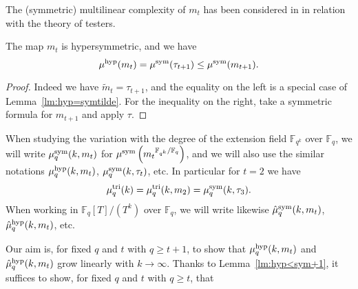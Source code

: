 \documentclass[11pt]{article}
\begin{document}
The (symmetric) multilinear complexity of $m_t$ has been considered in \cite{Bshouty13} in relation with the theory of testers.

\begin{lm}
\label{lm:hyp<sym+1}
The map $m_t$ is hypersymmetric, and we have
\[
\mu^{\textrm{hyp}}(m_t)=\mu^{\textrm{sym}}(\tau_{t+1})\leq\mu^{\textrm{sym}}(m_{t+1}).
\] 
\end{lm}
\begin{proof}
Indeed we have $\widetilde{m}_t=\tau_{t+1}$, and the equality on the left is a special case of Lemma~\ref{lm:hyp=symtilde}.
For the inequality on the right, take a symmetric formula for $m_{t+1}$ and apply $\tau$.
\end{proof}

When studying the variation with the degree of the extension field $\mathbb{F}_{q^k}$ over $\mathbb{F}_q$,
we will write $\mu^{\textrm{sym}}_q(k,m_t)$ for $\mu^{\textrm{sym}}\left({m_t}^{\mathbb{F}_{q^k}/\mathbb{F}_q}\right)$,
and we will also use the similar notations $\mu^{\textrm{hyp}}_q(k,m_t)$, $\mu^{\textrm{sym}}_q(k,\tau_t)$, etc.
In particular for $t=2$ we have
\[
\mu^{\textrm{tri}}_q(k)=\mu^{\textrm{tri}}_q(k,m_2)=\mu^{\textrm{sym}}_q(k,\tau_3).
\]
When working in $\mathbb{F}_q[T]/(T^k)$ over $\mathbb{F}_q$,
we will write likewise $\hat\mu^{\textrm{sym}}_q(k,m_t)$, $\hat\mu^{\textrm{hyp}}_q(k,m_t)$, etc.

Our aim is, for fixed $q$ and $t$ with $q\geq t+1$, to show that $\mu^{\textrm{hyp}}_q(k,m_t)$ and $\hat\mu^{\textrm{hyp}}_q(k,m_t)$ grow linearly with $k\to\infty$.
Thanks to Lemma~\ref{lm:hyp<sym+1}, it suffices to show, for fixed $q$ and $t$ with $q\geq t$, that
\end{document}
